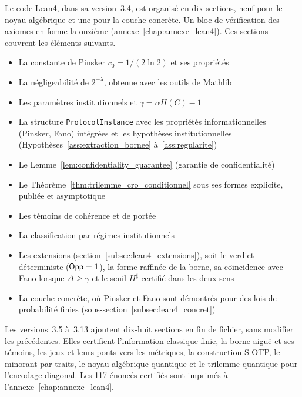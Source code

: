 \begin{sloppypar}
Le code Lean4, dans sa version~3.4, est organis\'e en dix sections, neuf pour le noyau
alg\'ebrique et une pour la couche concr\`ete. Un bloc de v\'erification des axiomes en
forme la onzi\`eme (annexe~\ref{chap:annexe_lean4}). Ces sections couvrent les
\'el\'ements suivants.
\begin{itemize}
    \item La constante de Pinsker $c_0 = 1/(2\ln 2)$ et ses propri\'et\'es
    \item La n\'egligeabilit\'e de $2^{-\lambda}$, obtenue avec les outils de Mathlib
    \item Les param\`etres institutionnels et $\gamma = \alpha H(C) - 1$
    \item La structure \texttt{ProtocolInstance} avec les propri\'et\'es
          informationnelles (Pinsker, Fano) int\'egr\'ees et les hypoth\`eses institutionnelles
          (Hypoth\`eses~\ref{ass:extraction_bornee} \`a~\ref{ass:regularite})
    \item Le Lemme~\ref{lem:confidentiality_guarantee} (garantie de confidentialit\'e)
    \item Le Th\'eor\`eme~\ref{thm:trilemme_cro_conditionnel} sous ses formes explicite,
          publi\'ee et asymptotique
    \item Les t\'emoins de coh\'erence et de port\'ee
    \item La classification par r\'egimes institutionnels
    \item Les extensions (section~\ref{subsec:lean4_extensions}), soit le verdict
          d\'eterministe ($\mathsf{Opp} = 1$), la forme raffin\'ee de la borne, sa
          co\"{\i}ncidence avec Fano lorsque $\Delta \geq \gamma$ et le seuil $H^\sharp$ certifi\'e dans les deux sens
    \item La couche concr\`ete, o\`u Pinsker et Fano sont d\'emontr\'es pour des lois de
          probabilit\'e finies (sous-section~\ref{subsec:lean4_concret})
\end{itemize}

Les versions~3.5 \`a~3.13 ajoutent dix-huit sections en fin de fichier, sans modifier les
pr\'ec\'edentes. Elles certifient l'information classique finie, la borne aigu\"e et ses
t\'emoins, les jeux et leurs ponts vers les m\'etriques, la construction S-OTP, le minorant par
traits, le noyau alg\'ebrique quantique et le trilemme quantique pour l'encodage diagonal. Les
117 \'enonc\'es certifi\'es sont imprim\'es \`a l'annexe~\ref{chap:annexe_lean4}.


\end{sloppypar}
